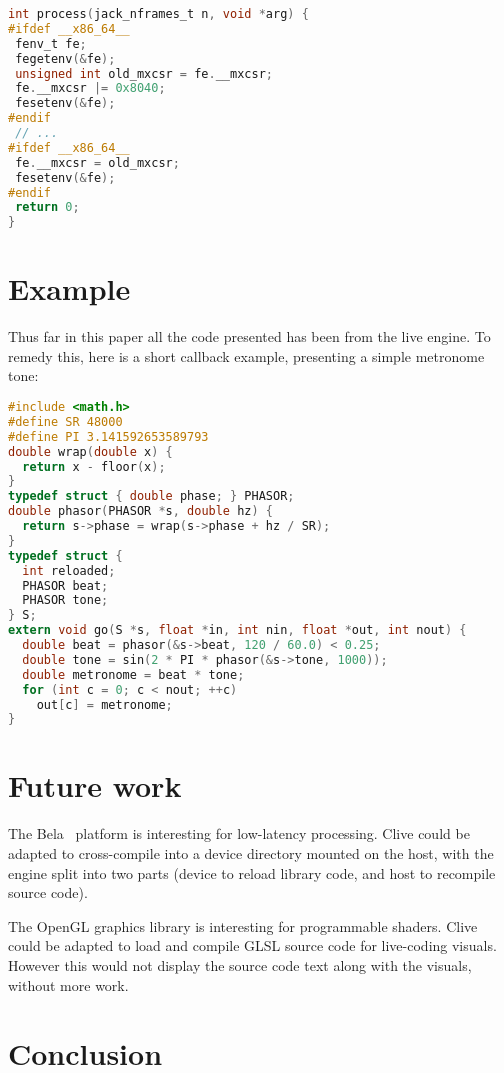 \documentclass[11pt,a4paper]{article}
\begin{document}
\begin{lstlisting}[language=C, caption={Setting DAZ and FTZ}, label=ldenormal]
int process(jack_nframes_t n, void *arg) {
#ifdef __x86_64__
 fenv_t fe;
 fegetenv(&fe);
 unsigned int old_mxcsr = fe.__mxcsr;
 fe.__mxcsr |= 0x8040;
 fesetenv(&fe);
#endif
 // ...
#ifdef __x86_64__
 fe.__mxcsr = old_mxcsr;
 fesetenv(&fe);
#endif
 return 0;
}
\end{lstlisting}

\section{Example}\label{example}

Thus far in this paper all the code presented has been from the live
engine. To remedy this, here is a short callback example, presenting
a simple metronome tone:

\begin{lstlisting}[language=C, caption={Metronome example}, label=lexample]
#include <math.h>
#define SR 48000
#define PI 3.141592653589793
double wrap(double x) {
  return x - floor(x);
}
typedef struct { double phase; } PHASOR;
double phasor(PHASOR *s, double hz) {
  return s->phase = wrap(s->phase + hz / SR);
}
typedef struct {
  int reloaded;
  PHASOR beat;
  PHASOR tone;
} S;
extern void go(S *s, float *in, int nin, float *out, int nout) {
  double beat = phasor(&s->beat, 120 / 60.0) < 0.25;
  double tone = sin(2 * PI * phasor(&s->tone, 1000));
  double metronome = beat * tone;
  for (int c = 0; c < nout; ++c)
    out[c] = metronome;
}
\end{lstlisting}

\section{Future work}\label{future-work}

The Bela~\cite{BELA} platform is interesting for low-latency processing.
Clive could be adapted to cross-compile into a device directory mounted on
the host, with the engine split into two parts (device to reload library
code, and host to recompile source code).

The OpenGL graphics library is interesting for programmable shaders.  Clive
could be adapted to load and compile GLSL source code for live-coding visuals.
However this would not display the source code text along with the visuals,
without more work.

\section{Conclusion}\label{conclusion}
\end{document}
